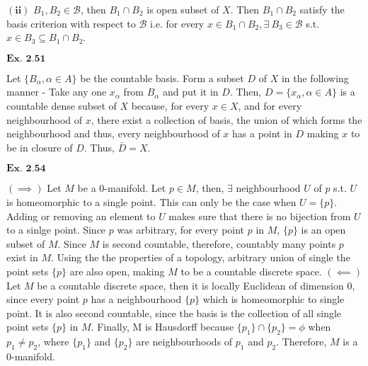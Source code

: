 \documentclass{article}
\begin{document}
$\mathbf{(ii)}$ $B_1, B_2 \in \mathcal{B}$, then $B_1 \cap B_2$ is open subset of $X$. Then $B_1 \cap B_2$ satisfy the basis criterion with respect to $\mathcal{B}$ i.e. for every $x \in B_1\cap B_2, \exists\ B_3 \in \mathcal{B}$ s.t. $x \in B_3 \subseteq B_1 \cap B_2$.

\vspace{0.2in}

${\textbf{Ex. 2.51}}$

Let $\{B_{\alpha}, \alpha \in A\}$ be the countable basis. Form a subset $D$ of $X$ in the following manner - Take any one $x_{\alpha}$ from $B_{\alpha}$ and put it in $D$. Then, $D = \{x_{\alpha}, \alpha \in A\}$ is a countable dense subset of $X$ because, for every $x \in X$, and for every neighbourhood of $x$, there exist a collection of basis, the union of which forms the neighbourhood and thus, every neighbourhood of $x$ has a point in $D$ making $x$ to be in closure of $D$. Thus, $\bar{D} = X$.

\vspace{0.2in}

${\textbf{Ex. 2.54}}$

$(\implies)$ Let $M$ be a $0$-manifold. Let $p \in M$, then, $\exists$ neighbourhood $U$ of $p$ s.t. $U$ is homeomorphic to a single point. This can only be the case when $U = \{p\}$. Adding or removing an element to $U$ makes sure that there is no bijection from $U$ to a sinlge point. Since $p$ was arbitrary, for every point $p$ in $M$,  $\{p\}$ is an open subset of $M$. Since $M$ is second countable, therefore, countably many points $p$ exist in $M$. Using the the properties of a topology, arbitrary union of single the point sets $\{p\}$ are also open, making $M$ to be a countable discrete space. $(\impliedby)$ Let $M$ be a countable discrete space, then it is locally Euclidean of dimension $0$, since every point $p$ has a neighbourhood $\{p\}$ which is homeomorphic to single point. It is also second countable, since the basis is the collection of all single point sets $\{p\}$ in $M$. Finally, M is Hausdorff because $\{p_1\}\cap \{p_2\} = \phi$ when $p_1 \neq p_2$, where $\{p_1\}$ and $\{p_2\}$ are neighbourhoods of $p_1$ and $p_2$. Therefore, $M$ is a $0$-manifold.

\vspace{0.2in}
\clearpage

\end{document}
